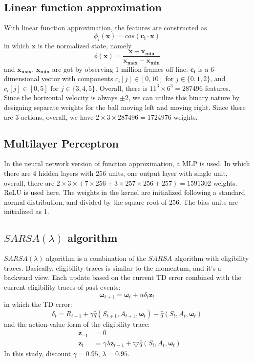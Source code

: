 \documentclass[12pt]{article}
\begin{document}
\subsection{Linear function approximation}
With linear function approximation, the features are constructed as 
\begin{equation}
    \phi_i(\bm{x})=cos(\bm{c_i} \cdot \bm{x})
\end{equation}
in which $\bm x$ is the normalized state, namely
\begin{equation}
    \phi(\bm{x})= \frac{\bm{x}-\bm{x_{min}}}{\bm{x_{max}}-\bm{x_{min}}}
\end{equation}
and $\bm{x_{max}}$, $\bm{x_{min}}$ are got by observing 1 million
frames off\--line. $\bm{c_i}$ is a 6\--dimensional vector with
components $c_i[j]\in[0, 10]$ for $j\in \{0, 1, 2\}$, and  
$c_i[j]\in[0, 5]$ for $j\in \{3, 4, 5\}$. Overall, there is
$11^3\times 6^3=287496$ features. \\
Since the horizontal velocity is always $\pm 2$, we can utilize this
binary nature by designing separate weights for the ball moving left
and moving right. Since there are $3$ actions, overall, we have
$2\times3\times 287496=1724976$ weights.
\subsection{Multilayer Perceptron}
In the neural network version of function approximation, a MLP is
used. In which there are 4 hidden layers with 256 units, one output
layer with single unit, overall, there are 
$2\times3\times(7\times256+3\times257\times256+257)=1591302$
weights. ReLU is used here. The weights in the kernel are initialized
following a standard normal distribution, and divided by the square
root of 256. The bias units are initialized as 1. 
\subsection{$SARSA(\lambda)$ algorithm}
$SARSA(\lambda)$ algorithm is a combination of the $SARSA$ algorithm with
eligibility traces\cite{18sutton}. Basically, eligibility traces is
similar to the momentum, and it's a backward view. Each update based
on the current TD error combined with the current eligibility traces
of past events:
\begin{equation}
    \bm{\omega}_{t+1}=\bm{\omega}_t+\alpha \delta_t \bm{z}_t
\end{equation}
in which the TD error:
\begin{equation}
    \delta_{t}=R_{t+1}+\gamma \hat{q}(S_{t+1}, A_{t+1}, \bm \omega_t)-
                              \hat{q}(S_{t},   A_{t}, \bm \omega_t)
\end{equation}
and the action\--value form of the eligibility trace:
\begin{eqnarray}
    &\bm{z}_{-1}&=0 \nonumber\\
    &\bm{z}_{t}&=\gamma \lambda \bm z_{t-1}+
                 \bigtriangledown \hat q(S_{t},   A_{t}, \bm \omega_t)
\end{eqnarray}
In this study, discount $\gamma=0.95$, $\lambda=0.95$. 
\end{document}

